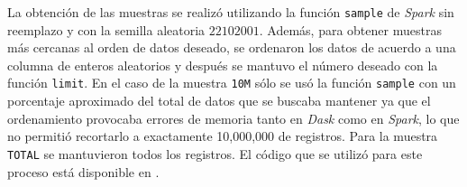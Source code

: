 La obtención de las muestras se realizó utilizando la función \texttt{sample} de \textit{Spark} sin reemplazo y con la semilla aleatoria $22102001$. Además, para obtener muestras más cercanas al orden de datos deseado, se ordenaron los datos de acuerdo a una columna de enteros aleatorios y después se mantuvo el número deseado con la función \texttt{limit}. En el caso de la muestra \texttt{10M} sólo se usó la función \texttt{sample} con un porcentaje aproximado del total de datos que se buscaba mantener ya que el ordenamiento provocaba errores de memoria tanto en \textit{Dask} como en \textit{Spark}, lo que no permitió recortarlo a exactamente 10,000,000 de registros. Para la muestra \texttt{TOTAL} se mantuvieron todos los registros. El código que se utilizó para este proceso está disponible en \cite{proceso-muestreo}.